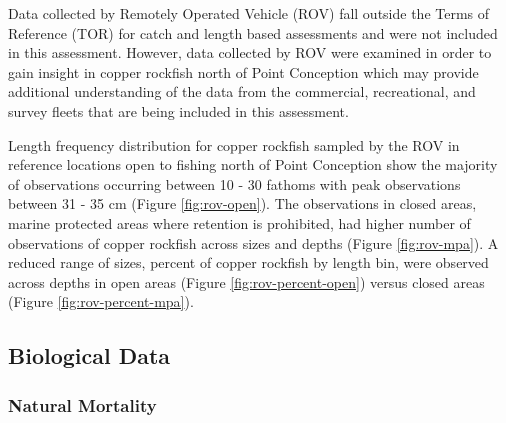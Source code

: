 \documentclass[11pt,
  english,
  a4paper,
]{article}
\begin{document}
\leavevmode\tagmcend\tagstructend


Data collected by Remotely Operated Vehicle (ROV) fall outside the Terms of Reference (TOR) for catch and length based assessments and were not included in this assessment. However, data collected by ROV were examined in order to gain insight in copper rockfish north of Point Conception which may provide additional understanding of the data from the commercial, recreational, and survey fleets that are being included in this assessment.

\leavevmode\tagmcend\tagstructend\par


Length frequency distribution for copper rockfish sampled by the ROV in reference locations open to fishing north of Point Conception show the majority of observations occurring between 10 - 30 fathoms with peak observations between 31 - 35 cm (Figure \ref{fig:rov-open}). The observations in closed areas, marine protected areas where retention is prohibited, had higher number of observations of copper rockfish across sizes and depths (Figure \ref{fig:rov-mpa}). A reduced range of sizes, percent of copper rockfish by length bin, were observed across depths in open areas (Figure \ref{fig:rov-percent-open}) versus closed areas (Figure \ref{fig:rov-percent-mpa}).

\leavevmode\tagmcend\tagstructend\par


\hypertarget{bio-data}{%
\subsection{Biological Data}\label{bio-data}}

\leavevmode\tagmcend\tagstructend


\hypertarget{natural-mortality}{%
\subsubsection{Natural Mortality}\label{natural-mortality}}

\leavevmode\tagmcend\tagstructend

\end{document}
